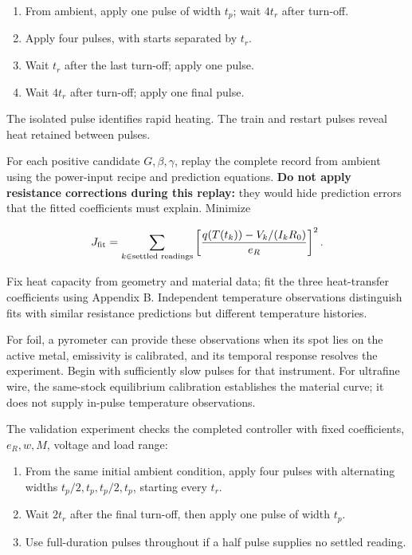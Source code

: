 \documentclass[11pt,letterpaper]{article}
\begin{document}
\begin{enumerate}[start=1]
\item From ambient, apply one pulse of width \(t_p\); wait \(4t_r\) after turn-off.
\item Apply four pulses, with starts separated by \(t_r\).
\item Wait \(t_r\) after the last turn-off; apply one pulse.
\item Wait \(4t_r\) after turn-off; apply one final pulse.
\end{enumerate}

The isolated pulse identifies rapid heating. The train and restart pulses reveal heat retained between pulses.

For each positive candidate \(G,\beta,\gamma\), replay the complete record from ambient using the power-input recipe and prediction equations. \textbf{Do not apply resistance corrections during this replay:} they would hide prediction errors that the fitted coefficients must explain. Minimize

\[
J_{\rm fit}=\sum_{k\in\text{settled readings}}
\left[\frac{q(T(t_k))-V_k/(I_kR_0)}{e_R}\right]^2.
\]

Fix heat capacity from geometry and material data; fit the three heat-transfer coefficients using Appendix B. Independent temperature observations distinguish fits with similar resistance predictions but different temperature histories.

For foil, a pyrometer can provide these observations when its spot lies on the active metal, emissivity is calibrated, and its temporal response resolves the experiment. Begin with sufficiently slow pulses for that instrument. For ultrafine wire, the same-stock equilibrium calibration establishes the material curve; it does not supply in-pulse temperature observations.

The validation experiment checks the completed controller with fixed coefficients, \(e_R,w,M\), voltage and load range:

\begin{enumerate}[start=1]
\item From the same initial ambient condition, apply four pulses with alternating widths \(t_p/2,t_p,t_p/2,t_p\), starting every \(t_r\).
\item Wait \(2t_r\) after the final turn-off, then apply one pulse of width \(t_p\).
\item Use full-duration pulses throughout if a half pulse supplies no settled reading.
\end{enumerate}
\end{document}

